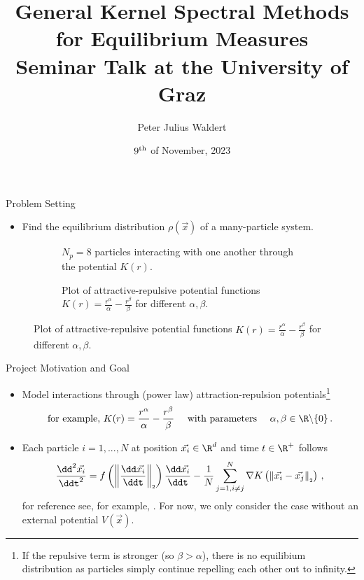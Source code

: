 \documentclass[aspectratio=169, hyperref={colorlinks=true}]{beamer}
\title{General Kernel Spectral Methods for Equilibrium Measures \\ \normalsize Seminar Talk at the University of Graz}
\author{Peter Julius Waldert}
\institute{Mathematical Institute \\ University of Oxford}
\date{$9^{\rm th}$ of November, 2023}
\begin{document}
  {\frame{\titlepage}}

  \begin{frame}{Problem Setting}
    \begin{itemize}
      \item Find the equilibrium distribution $\rho(\vec{x})$ of a many-particle system.
    \end{itemize}
    \begin{figure}[H]
      \centering
      \begin{subfigure}[t]{0.5\textwidth}
        \centering
        \caption*{$N_p = 8$ particles interacting with one another through the potential $K(r)$.}
      \end{subfigure}
      \hfill
      \begin{subfigure}[t]{0.49\textwidth}
        \centering
        \caption*{Plot of attractive-repulsive potential functions $K(r) = \frac{r^\alpha}{\alpha} - \frac{r^\beta}{\beta}$ for different $\alpha, \beta$.}
      \end{subfigure}
    \end{figure}
  \end{frame}

  {
  \begin{frame}{Project Motivation and Goal}
    \vspace{0.4cm}
    \begin{itemize}
      \item Model interactions through (power law) attraction-repulsion potentials\footnote{If the repulsive term is stronger (so $\beta > \alpha$), there is no equilibium distribution as particles simply continue repelling each other out to infinity.}
            $$\text{for example,}~K(r) = \frac{r^\alpha}{\alpha} - \frac{r^\beta}{\beta}\quad \text{ with parameters } \quad \alpha, \beta \in \R \backslash \{0\}\,.$$
      \item Each particle $i=1, ..., N$ at position $\vec{x_i} \in \R^d$ and time $t \in \R^+$ follows
            $$\frac{\dd^2 \vec{x_i}}{\ddt^2} = f\left(\norm{\frac{\dd \vec{x_i}}{\ddt}}\right) \frac{\dd\vec{x_i}}{\ddt} - \frac{1}{N} \sum_{j=1, i\neq j}^{N} \nabla K\left(\norm{\vec{x_i} - \vec{x_j}}\right)\,,$$
            for reference see, for example, \parencite{2020-power-law-kernels, 2021-arbitrary-dimensions}.
            For now, we only consider the case without an external potential $V(\vec{x})$.
    \end{itemize}
  \end{frame}
  }
\end{document}
